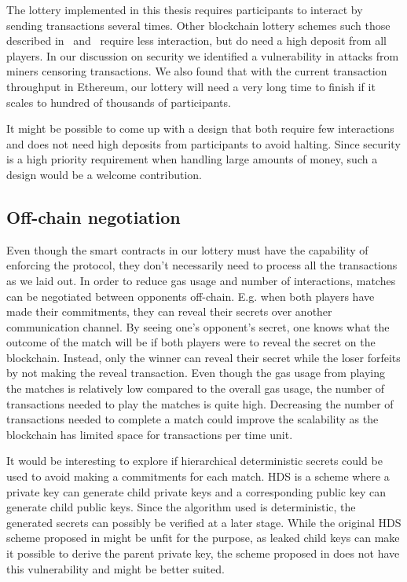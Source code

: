 The lottery implemented in this thesis requires participants to interact by sending transactions several times. Other blockchain lottery schemes such those described in~\cite{andrychowicz_secure_2014} and~\cite{bentov_how_2014} require less interaction, but do need a high deposit from all players. In our discussion on security we identified a vulnerability in attacks from miners censoring transactions. We also found that with the current transaction throughput in Ethereum, our lottery will need a very long time to finish if it scales to hundred of thousands of participants. 

It might be possible to come up with a design that both require few interactions and does not need high deposits from participants to avoid halting. Since security is a high priority requirement when handling large amounts of money, such a design would be a welcome contribution.

\subsection{Off-chain negotiation}

Even though the smart contracts in our lottery must have the capability of enforcing the protocol, they don't necessarily need to process all the transactions as we laid out. In order to reduce gas usage and number of interactions, matches can be negotiated between opponents off-chain. E.g. when both players have made their commitments, they can reveal their secrets over another communication channel. By seeing one's opponent's secret, one knows what the outcome of the match will be if both players were to reveal the secret on the blockchain. Instead, only the winner can reveal their secret while the loser forfeits by not making the reveal transaction. Even though the gas usage from playing the matches is relatively low compared to the overall gas usage, the number of transactions needed to play the matches is quite high. Decreasing the number of transactions needed to complete a match could improve the scalability as the blockchain has limited space for transactions per time unit.

It would be interesting to explore if hierarchical deterministic secrets could be used to avoid making a commitments for each match. HDS is a scheme where a private key can generate child private keys and a corresponding public key can generate child public keys. Since the algorithm used is deterministic, the generated secrets can possibly be verified at a later stage. While the original HDS scheme proposed in \cite{wuille_bitcoin_2012} might be unfit for the purpose, as leaked child keys can make it possible to derive the parent private key, the scheme proposed in \cite{gutoski_hierarchical_2015} does not have this vulnerability and might be better suited.

